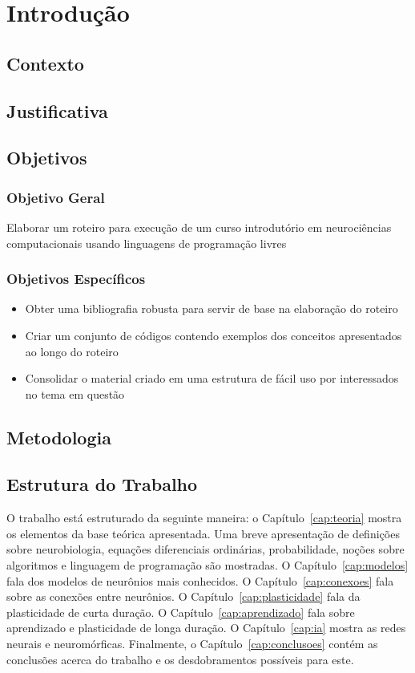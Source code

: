 \chapter{Introdução}\label{cap:introducao}
\section{Contexto}

\section{Justificativa}

\section{Objetivos}
\subsection{Objetivo Geral}
Elaborar um roteiro para execução de um curso introdutório em neurociências computacionais usando linguagens de programação livres

\subsection{Objetivos Específicos}
\begin{itemize}
\item Obter uma bibliografia robusta para servir de base na elaboração do roteiro
\item Criar um conjunto de códigos contendo exemplos dos conceitos apresentados ao longo do roteiro
\item Consolidar o material criado em uma estrutura de fácil uso por interessados no tema em questão
\end{itemize}

\section{Metodologia}

\section{Estrutura do Trabalho}
O trabalho está estruturado da seguinte maneira: o Capítulo~\ref{cap:teoria} mostra os elementos da base teórica apresentada. Uma breve apresentação de definições sobre neurobiologia, equações diferenciais ordinárias, probabilidade, noções sobre algoritmos e linguagem de programação são mostradas. O Capítulo~\ref{cap:modelos} fala dos modelos de neurônios mais conhecidos. O Capítulo~\ref{cap:conexoes} fala sobre as conexões entre neurônios. O Capítulo~\ref{cap:plasticidade} fala da plasticidade de curta duração. O Capítulo~\ref{cap:aprendizado} fala sobre aprendizado e plasticidade de longa duração. O Capítulo~\ref{cap:ia} mostra as redes neurais e neuromórficas. Finalmente, o Capítulo~\ref{cap:conclusoes} contém as conclusões acerca do trabalho e os desdobramentos possíveis para este.
